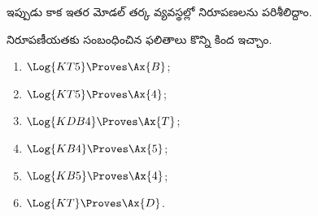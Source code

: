 \documentclass[../../../include/open-logic-section]{subfiles}
\begin{document}


ఇప్పుడు  కాక ఇతర మోడల్ తర్క వ్యవస్థల్లో
నిరూపణలను పరిశీలిద్దాం.

\begin{prop}
నిరూపణీయతకు సంబంధించిన ఫలితాలు కొన్ని కింద ఇచ్చాం.
  \begin{enumerate}
  \item $\Log{KT5} \Proves \Ax{B}$;
  \item $\Log{KT5} \Proves \Ax{4}$;
  \item $\Log{KDB4} \Proves \Ax{T}$;
  \item $\Log{KB4} \Proves \Ax{5}$;
  \item $\Log{KB5} \Proves \Ax{4}$;
  \item {}$\Log{KT} \Proves \Ax{D}$.
  \end{enumerate}
\end{prop}
\end{document}
